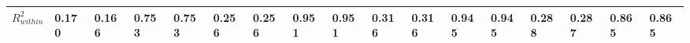 \begin{tabular}{lllllllllllllllll}
$R^2_{within}$               &                               0.170 &                               0.166 &                               0.753 &                               0.753 &                               0.256 &                               0.256 &                               0.951 &                               0.951 &                               0.316 &                               0.316 &                               0.945 &                               0.945 &                               0.288 &                              0.287 &                              0.865 &                              0.865 \\
\bottomrule
\end{tabular}
